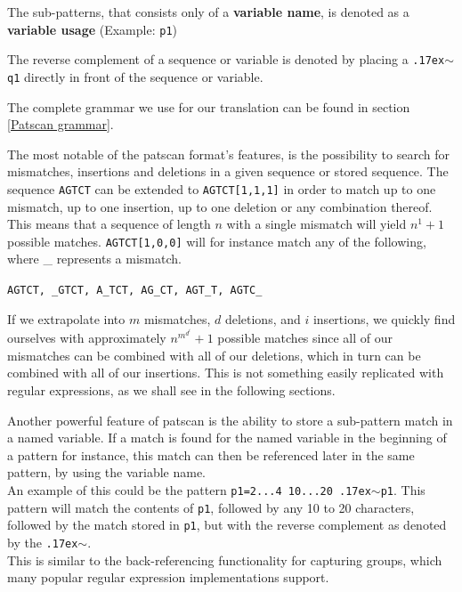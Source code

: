 \documentclass[12pt]{article}
\theoremstyle{definition}
\begin{document}
\begin{definition}
The sub-patterns, that consists only of a \textbf{variable name}, is denoted as a \textbf{variable usage} (Example: \texttt{p1})
\end{definition}

\begin{definition}
The reverse complement of a sequence or variable is denoted by placing a \texttt{{\raise.17ex\hbox{$\scriptstyle\mathtt{\sim}$}}q1} directly in front of the sequence or variable.
\end{definition}

The complete grammar we use for our translation can be found in section \ref{Patscan grammar}.

The most notable of the patscan format's features, is the possibility to search for mismatches, insertions and deletions in a given sequence or stored sequence. The sequence \texttt{AGTCT} can be extended to \texttt{AGTCT[1,1,1]} in order to match up to one mismatch, up to one insertion, up to one deletion or any combination thereof. \\
This means that a sequence of length $n$ with a single mismatch will yield $n^1+1$ possible matches. \texttt{AGTCT[1,0,0]} will for instance match any of the following, where \_ represents a mismatch.

\texttt{AGTCT, \_GTCT, A\_TCT, AG\_CT, AGT\_T, AGTC\_}

If we extrapolate into $m$ mismatches, $d$ deletions, and $i$ insertions, we quickly find ourselves with approximately $n^{m^{d^{i}}}+1$ possible matches since all of our mismatches can be combined with all of our deletions, which in turn can be combined with all of our insertions. This is not something easily replicated with regular expressions, as we shall see in the following sections.

Another powerful feature of patscan is the ability to store a sub-pattern match in a named variable. If a match is found for the named variable in the beginning of a pattern for instance, this match can then be referenced later in the same pattern, by using the variable name. \\
An example of this could be the pattern \texttt{p1=2...4 10...20 {\raise.17ex\hbox{$\scriptstyle\mathtt{\sim}$}}p1}. This pattern will match the contents of \texttt{p1}, followed by any 10 to 20 characters, followed by the match stored in \texttt{p1}, but with the reverse complement as denoted by the \texttt{{\raise.17ex\hbox{$\scriptstyle\mathtt{\sim}$}}}.\\
This is similar to the back-referencing functionality for capturing groups, which many popular regular expression implementations support.%
\end{document}

